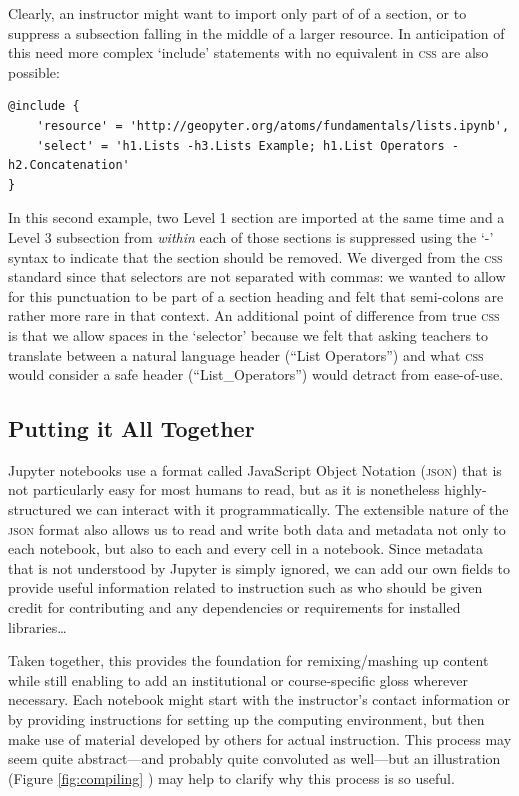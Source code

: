 \documentclass[letter, 11pt,titlepage]{article}
\begin{document}
Clearly, an instructor might want to import only part of of a section, or to suppress a subsection falling in the middle of a larger resource. In anticipation of this need more complex `include' statements with no equivalent in \textsc{css} are also possible:
\begin{Verbatim}[fontsize=\small]
@include {
    'resource' = 'http://geopyter.org/atoms/fundamentals/lists.ipynb',
    'select' = 'h1.Lists -h3.Lists Example; h1.List Operators -h2.Concatenation'
}
\end{Verbatim}
In this second example, two Level 1 section are imported at the same time and a Level 3 subsection from \emph{within} each of those sections is suppressed using the `-' syntax to indicate that the section should be removed. We diverged from the \textsc{css} standard since that selectors are not separated with commas: we wanted to allow for this punctuation to be part of a section heading and felt that semi-colons are rather more rare in that context. An additional point of difference from true \textsc{css} is that we allow spaces in the `selector' because we felt that asking teachers to translate between a natural language header (``List Operators'') and what \textsc{css} would consider a safe header (``List\_Operators'') would detract from ease-of-use.

\subsection{Putting it All Together}

Jupyter notebooks use a format called JavaScript Object Notation (\textsc{json}) that is not particularly easy for most humans to read, but as it is nonetheless highly-structured we can interact with it programmatically. The extensible nature of the \textsc{json} format also allows us to read and write both data and metadata not only to each notebook, but also to each and every cell in a notebook. Since metadata that is not understood by Jupyter is simply ignored, we can add our own fields to provide useful information related to instruction such as who should be given credit for contributing and any dependencies or requirements for installed libraries\ldots

Taken together, this provides the foundation for remixing/mashing up content while still enabling to add an institutional or course-specific gloss wherever necessary. Each notebook might start with the instructor's contact information or by providing instructions for setting up the computing environment, but then make use of material developed by others for actual instruction. This process may seem quite abstract---and probably quite convoluted as well---but an illustration (Figure \ref{fig:compiling} ) may help to clarify why this process is so useful.
\end{document}
